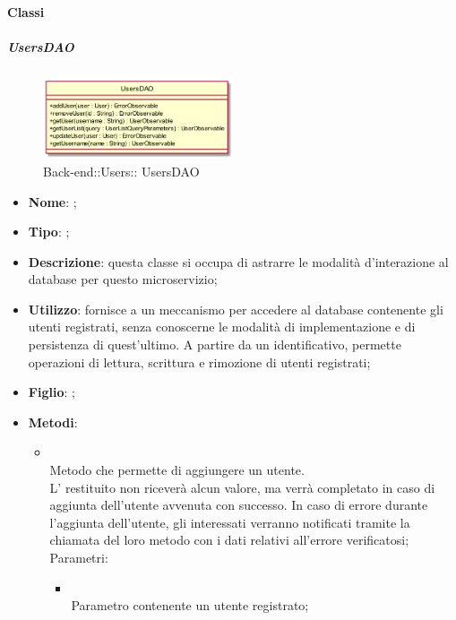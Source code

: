 \paragraph{Classi}
\hypertarget{ UsersDAO_label}{\subparagraph{ UsersDAO}}
\begin{figure}[h]
	\centering
	\includegraphics[width=0.50\textwidth,height=\textheight,keepaspectratio]{images/ClassUsersDAO.png}
	\caption{Back-end::Users:: UsersDAO}
\end{figure}
\begin{itemize}
	\item \textbf{Nome}: ;
	\item \textbf{Tipo}: ;
	\item \textbf{Descrizione}: questa classe si occupa di astrarre le modalità d'interazione al database per questo microservizio;
	\item \textbf{Utilizzo}: fornisce a  un meccanismo per accedere al database contenente gli utenti registrati, senza conoscerne le modalità di implementazione e di persistenza di quest'ultimo.
A partire da un identificativo, permette operazioni di lettura, scrittura e rimozione di utenti registrati;
	\item \textbf{Figlio}: ;
	\item \textbf{Metodi}:
	\begin{itemize}
		\item[]  \\		Metodo che permette di aggiungere un utente. \\
L' restituito non riceverà alcun valore, ma verrà completato in caso di aggiunta dell'utente avvenuta con successo. In caso di errore durante l'aggiunta dell'utente, gli  interessati verranno notificati tramite la chiamata del loro metodo  con i dati relativi all'errore verificatosi;\\
		Parametri:
		\begin{itemize}
			\item {} \\
			Parametro contenente un utente registrato;

\end{itemize}
\end{itemize}
\end{itemize}

